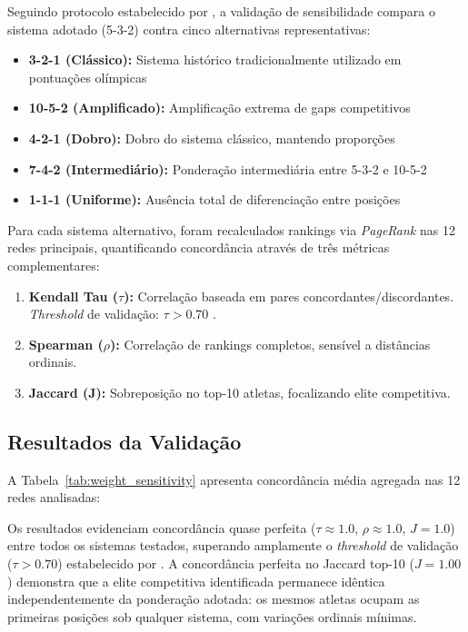 Seguindo protocolo estabelecido por , a validação de sensibilidade compara o sistema adotado (5-3-2) contra cinco alternativas representativas:

\begin{itemize}
    \item \textbf{3-2-1 (Clássico):} Sistema histórico tradicionalmente utilizado em pontuações olímpicas
    \item \textbf{10-5-2 (Amplificado):} Amplificação extrema de gaps competitivos
    \item \textbf{4-2-1 (Dobro):} Dobro do sistema clássico, mantendo proporções
    \item \textbf{7-4-2 (Intermediário):} Ponderação intermediária entre 5-3-2 e 10-5-2
    \item \textbf{1-1-1 (Uniforme):} Ausência total de diferenciação entre posições
\end{itemize}

Para cada sistema alternativo, foram recalculados rankings via \textit{PageRank}{} nas 12 redes principais, quantificando concordância através de três métricas complementares:

\begin{enumerate}
    \item \textbf{Kendall Tau ($\tau$):} Correlação baseada em pares concordantes/discordantes. \textit{Threshold} de validação: $\tau > 0.70$ \cite{Shiue2025ApplyingPageRank}.
    \item \textbf{Spearman ($\rho$):} Correlação de rankings completos, sensível a distâncias ordinais.
    \item \textbf{Jaccard (J):} Sobreposição no top-10 atletas, focalizando elite competitiva.
\end{enumerate}

\subsection{Resultados da Validação}

A Tabela~\ref{tab:weight_sensitivity} apresenta concordância média agregada nas 12 redes analisadas:



Os resultados evidenciam concordância quase perfeita ($\tau \approx 1.0$, $\rho \approx 1.0$, $J = 1.0$) entre todos os sistemas testados, superando amplamente o \textit{threshold} de validação ($\tau > 0.70$) estabelecido por . A concordância perfeita no Jaccard top-10 ($J = 1.00$) demonstra que a elite competitiva identificada permanece idêntica independentemente da ponderação adotada: os mesmos atletas ocupam as primeiras posições sob qualquer sistema, com variações ordinais mínimas.

